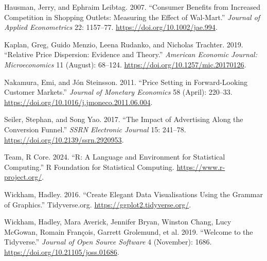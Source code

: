 \documentclass[
  letterpaper,
  DIV=11,
  numbers=noendperiod]{scrartcl}
\newlength{\cslhangindent}
\newenvironment{CSLReferences}[2] %
 {\begin{list}{}{%
  \setlength{\itemindent}{0pt}
  \setlength{\leftmargin}{0pt}
  \setlength{\parsep}{0pt}
  \ifodd #1
   \setlength{\leftmargin}{\cslhangindent}
   \setlength{\itemindent}{-1\cslhangindent}
  \fi
  \setlength{\itemsep}{#2\baselineskip}}}
 {\end{list}}
\begin{document}
\begin{CSLReferences}{1}{0}
Hausman, Jerry, and Ephraim Leibtag. 2007. {``Consumer Benefits from
Increased Competition in Shopping Outlets: Measuring the Effect of
Wal-Mart.''} \emph{Journal of Applied Econometrics} 22: 1157--77.
\url{https://doi.org/10.1002/jae.994}.

Kaplan, Greg, Guido Menzio, Leena Rudanko, and Nicholas Trachter. 2019.
{``Relative Price Dispersion: Evidence and Theory.''} \emph{American
Economic Journal: Microeconomics} 11 (August): 68--124.
\url{https://doi.org/10.1257/mic.20170126}.

Nakamura, Emi, and Jón Steinsson. 2011. {``Price Setting in
Forward-Looking Customer Markets.''} \emph{Journal of Monetary
Economics} 58 (April): 220--33.
\url{https://doi.org/10.1016/j.jmoneco.2011.06.004}.

Seiler, Stephan, and Song Yao. 2017. {``The Impact of Advertising Along
the Conversion Funnel.''} \emph{SSRN Electronic Journal} 15: 241--78.
\url{https://doi.org/10.2139/ssrn.2920953}.

Team, R Core. 2024. {``R: A Language and Environment for Statistical
Computing.''} R Foundation for Statistical Computing.
\url{https://www.r-project.org/}.

Wickham, Hadley. 2016. {``Create Elegant Data Visualisations Using the
Grammar of Graphics.''} Tidyverse.org.
\url{https://ggplot2.tidyverse.org/}.

Wickham, Hadley, Mara Averick, Jennifer Bryan, Winston Chang, Lucy
McGowan, Romain François, Garrett Grolemund, et al. 2019. {``Welcome to
the Tidyverse.''} \emph{Journal of Open Source Software} 4 (November):
1686. \url{https://doi.org/10.21105/joss.01686}.

\end{CSLReferences}
\end{document}
